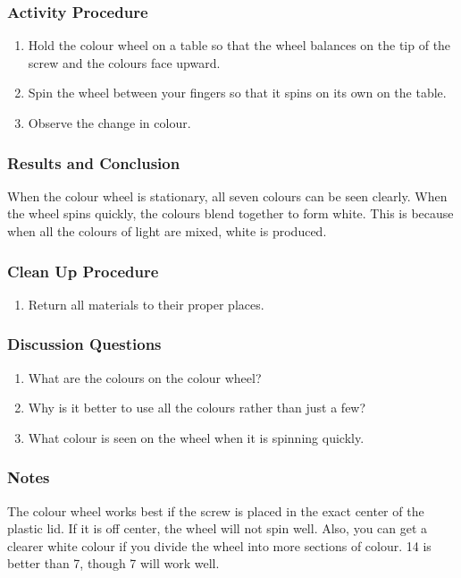 \subsubsection*{Activity Procedure}
\begin{enumerate}
\item{Hold the colour wheel on a table so that the wheel balances on the tip of the screw and the colours face upward.} 
\item{Spin the wheel between your fingers so that it spins on its own on the table.} 
\item{Observe the change in colour.} 
\end{enumerate}

\subsubsection*{Results and Conclusion}
When the colour wheel is stationary, all seven colours can be seen clearly. When the wheel spins quickly, the colours blend together to form white. This is because when all the colours of light are mixed, white is produced.  

\subsubsection*{Clean Up Procedure}
\begin{enumerate}
\item{Return all materials to their proper places.} 
\end{enumerate}

\subsubsection*{Discussion Questions}
\begin{enumerate}
\item{What are the colours on the colour wheel?}
\item{Why is it better to use all the colours rather than just a few?}
\item{What colour is seen on the wheel when it is spinning quickly.} 
\end{enumerate}

\subsubsection*{Notes}
The colour wheel works best if the screw is placed in the exact center of the plastic lid. If it is off center, the wheel will not spin well. Also, you can get a clearer white colour if you divide the wheel into more sections of colour. 14 is better than 7, though 7 will work well.  



